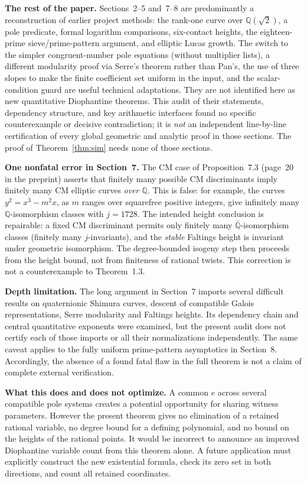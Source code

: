 \documentclass[11pt,a4paper]{article}
\theoremstyle{definition}
\newcommand{\QQ}{\mathbb Q}
\begin{document}
\textbf{The rest of the paper.}  Sections~2--5 and~7--8
are predominantly a reconstruction of earlier project
methods: the rank-one curve over $\QQ(\sqrt2)$, a pole
predicate, formal logarithm comparisons, six-contact
heights, the eighteen-prime sieve/prime-pattern argument,
and elliptic Lucas growth.  The switch to the simpler
congruent-number pole equations (without multiplier lists),
a different modularity proof via Serre's theorem rather than
Pan's, the use of three slopes to make the finite coefficient
set uniform in the input, and the scalar-condition guard are
useful technical adaptations.  They are not identified here
as new quantitative Diophantine theorems.  This audit of their statements, dependency
structure, and key arithmetic interfaces found no
specific counterexample or decisive contradiction;
it is \emph{not} an independent line-by-line certification
of every global geometric and analytic proof in those
sections.  The proof of Theorem~\ref{thm:sim} needs none
of those sections.

\textbf{One nonfatal error in Section~7.}  The CM case of
Proposition~7.3 (page~20 in the preprint) asserts that
finitely many possible CM discriminants imply finitely many
CM elliptic curves \emph{over $\QQ$}.  This is false:
for example, the curves $y^2=x^3-m^2x$, as $m$ ranges
over squarefree positive integers, give infinitely many
$\QQ$-isomorphism classes with $j=1728$.  The intended
height conclusion is repairable: a fixed CM discriminant
permits only finitely many $\overline{\QQ}$-isomorphism
classes (finitely many $j$-invariants), and the \emph{stable}
Faltings height is invariant under geometric isomorphism.
The degree-bounded isogeny step then proceeds from the
height bound, not from finiteness of rational twists.
This correction is not a counterexample to Theorem~1.3.

\textbf{Depth limitation.}  The long argument in Section~7
imports several difficult results on quaternionic Shimura
curves, descent of compatible Galois representations, Serre
modularity and Faltings heights.  Its dependency chain and
central quantitative exponents were examined, but the present
audit does not certify each of those imports or all their
normalizations independently.  The same caveat applies to
the fully uniform prime-pattern asymptotics in Section~8.
Accordingly, the absence of a found fatal flaw in the
full theorem is not a claim of complete external verification.

\textbf{What this does and does not optimize.}  A common
$e$ across several compatible pole systems creates a
potential opportunity for sharing witness parameters.
However the present theorem gives no elimination of a
retained rational variable, no degree bound for a defining
polynomial, and no bound on the heights of the rational
points.  It would be incorrect to announce an improved
Diophantine variable count from this theorem alone.
A future application must explicitly construct the
new existential formula, check its zero set in both
directions, and count all retained coordinates.
\end{document}
